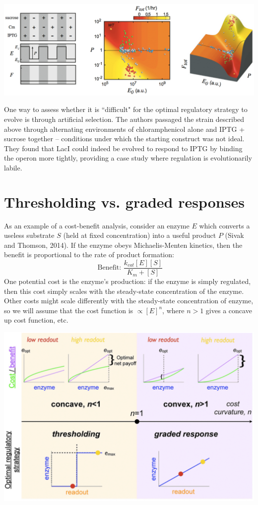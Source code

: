 \documentclass{article}
\begin{document}
\begin{center}
\includegraphics[width=\textwidth]{exp_evol_tans.pdf}
\end{center}

One way to assess whether it is ``difficult" for the optimal regulatory strategy to evolve is through artificial selection. The authors passaged the strain described above through alternating environments of chloramphenicol alone and IPTG + sucrose together -- conditions under which the starting construct was not ideal. They found that LacI could indeed be evolved to respond to IPTG by binding the operon more tightly, providing a case study where regulation is evolutionarily labile.

\section*{Thresholding vs. graded responses}

As an example of a cost-benefit analysis, consider an enzyme $E$ which converts a useless substrate $S$ (held at fixed concentration) into a useful product $P$ (Sivak and Thomson, 2014). If the enzyme obeys Michaelis-Menten kinetics, then the benefit is proportional to the rate of product formation:
\[ \textrm{ Benefit: } \frac{k_{cat} \left[ E \right] \left[ S \right] }{K_m + \left[ S \right] } \]
One potential cost is the enzyme's production: if the enzyme is simply regulated, then this cost simply scales with the steady-state concentration of the enzyme. Other costs might scale differently with the steady-state concentration of enzyme, so we will assume that the cost function is $\propto [E]^n$, where $n>1$ gives a concave up cost function, etc.

\begin{center}
\includegraphics[width=0.8 \textwidth]{sivak1.pdf}
\end{center}
\end{document}
